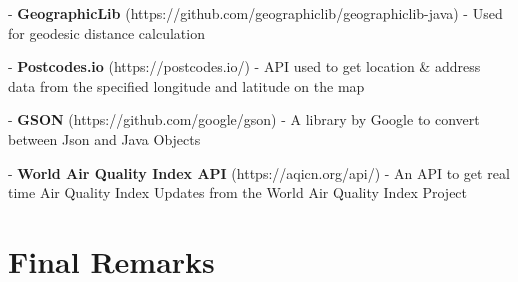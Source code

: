 \documentclass[10pt, a4paper]{scrartcl}
\begin{document}
\begin{multicols}{2}
        - \textbf{GeographicLib} (https://github.com/geographiclib/geographiclib-java) - Used for geodesic distance calculation

        - \textbf{Postcodes.io} (https://postcodes.io/) - API used to get location \& address data from the specified longitude and latitude on the map

        - \textbf{GSON} (https://github.com/google/gson) - A library by Google to convert between Json and Java Objects

        - \textbf{World Air Quality Index API} (https://aqicn.org/api/) - An API to get real time Air Quality Index Updates from the World Air Quality Index Project
        
        \section{Final Remarks}
        
    \end{multicols}
\end{document}
